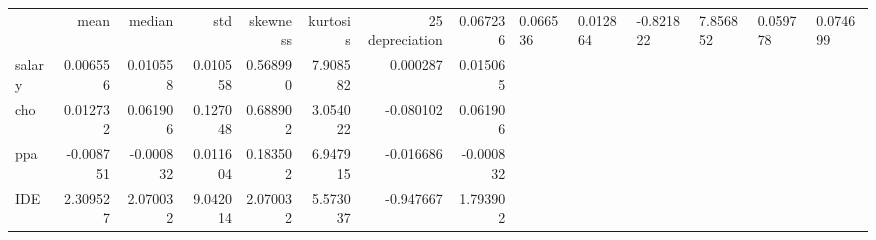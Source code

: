 \begin{tabular}{lrrrrrrr}
\toprule
 & mean & median & std & skewness & kurtosis & 25%
\midrule
depreciation & 0.067236 & 0.066536 & 0.012864 & -0.821822 & 7.856852 & 0.059778 & 0.074699 \\
salary & 0.006556 & 0.010558 & 0.010558 & 0.568990 & 7.908582 & 0.000287 & 0.015065 \\
cho & 0.012732 & 0.061906 & 0.127048 & 0.688902 & 3.054022 & -0.080102 & 0.061906 \\
ppa & -0.008751 & -0.000832 & 0.011604 & 0.183502 & 6.947915 & -0.016686 & -0.000832 \\
IDE & 2.309527 & 2.070032 & 9.042014 & 2.070032 & 5.573037 & -0.947667 & 1.793902 \\
\bottomrule
\end{tabular}

